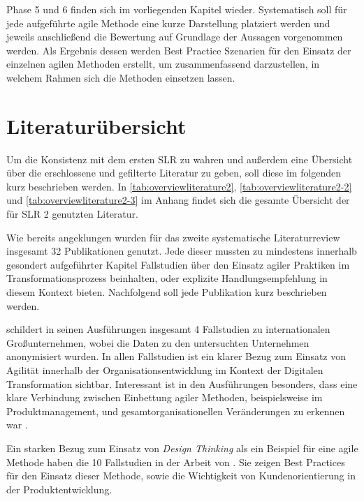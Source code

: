 Phase 5 und 6 finden sich im vorliegenden Kapitel wieder. Systematisch soll für jede aufgeführte agile Methode eine kurze Darstellung platziert werden und jeweils anschließend die Bewertung auf Grundlage der Aussagen vorgenommen werden. Als Ergebnis dessen werden Best Practice Szenarien für den Einsatz der einzelnen agilen Methoden erstellt, um zusammenfassend darzustellen, in welchem Rahmen sich die Methoden einsetzen lassen.


\section{Literaturübersicht}


Um die Konsistenz mit dem ersten SLR  zu wahren  und außerdem eine Übersicht über die erschlossene und  gefilterte Literatur zu geben, soll diese im folgenden kurz beschrieben werden. In  \ref{tab:overviewliterature2}, \ref{tab:overviewliterature2-2} und \ref{tab:overviewliterature2-3} im Anhang findet sich die  gesamte Übersicht der für SLR 2 genutzten Literatur.

Wie bereits angeklungen wurden für das zweite systematische Literaturreview insgesamt 32 Publikationen genutzt. Jede dieser mussten zu mindestens innerhalb gesondert aufgeführter Kapitel Fallstudien über den Einsatz agiler Praktiken im Transformationsprozess beinhalten, oder explizite Handlungsempfehlung in diesem Kontext bieten. Nachfolgend soll jede Publikation kurz beschrieben werden.

 schildert in seinen Ausführungen insgesamt 4 Fallstudien zu internationalen Großunternehmen, wobei die Daten zu den untersuchten Unternehmen anonymisiert wurden. In allen Fallstudien ist ein klarer Bezug zum Einsatz von Agilität innerhalb der Organisationsentwicklung im Kontext der Digitalen Transformation sichtbar. Interessant ist in den Ausführungen besonders, dass eine klare Verbindung zwischen Einbettung agiler Methoden, beispielsweise im Produktmanagement, und gesamtorganisationellen Veränderungen zu erkennen war .

Ein starken Bezug zum Einsatz von \textit{Design Thinking} als ein Beispiel für eine agile Methode haben die 10 Fallstudien in der Arbeit von . Sie zeigen Best Practices  für den Einsatz dieser Methode, sowie die Wichtigkeit von Kundenorientierung in der Produktentwicklung.

